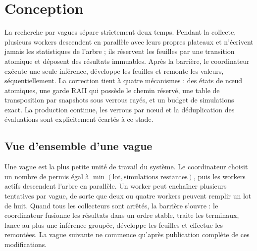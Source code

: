 \section{Conception}
\label{sec:conception}

\begin{resume}
La recherche par vagues s\'epare strictement deux temps. Pendant la collecte,
plusieurs workers descendent en parall\`ele avec leurs propres plateaux et
n'\'ecrivent jamais les statistiques de l'arbre ; ils r\'eservent les feuilles
par une transition atomique et d\'eposent des r\'esultats immuables. Apr\`es la
barri\`ere, le coordinateur ex\'ecute une seule inf\'erence, d\'eveloppe les
feuilles et remonte les valeurs, s\'equentiellement. La correction tient \`a
quatre m\'ecanismes : des \'etats de n\oe{}ud atomiques, une garde RAII qui
poss\`ede le chemin r\'eserv\'e, une table de transposition par snapshots
sous verrous ray\'es, et un budget de simulations exact. La production
continue, les verrous par n\oe{}ud et la d\'eduplication des \'evaluations
sont explicitement \'ecart\'es \`a ce stade.
\end{resume}

\subsection{Vue d'ensemble d'une vague}

Une vague est la plus petite unit\'e de travail du syst\`eme. Le coordinateur
choisit un nombre de permis \'egal \`a $\min(\text{lot}, \text{simulations
restantes})$, puis les workers actifs descendent l'arbre en parall\`ele. Un
worker peut encha\^iner plusieurs tentatives par vague, de sorte que deux ou
quatre workers peuvent remplir un lot de huit. Quand tous les collecteurs
sont arr\^et\'es, la barri\`ere s'ouvre : le coordinateur fusionne les
r\'esultats dans un ordre stable, traite les terminaux, lance au plus une
inf\'erence group\'ee, d\'eveloppe les feuilles et effectue les remont\'ees.
La vague suivante ne commence qu'apr\`es publication compl\`ete de ces
modifications.


